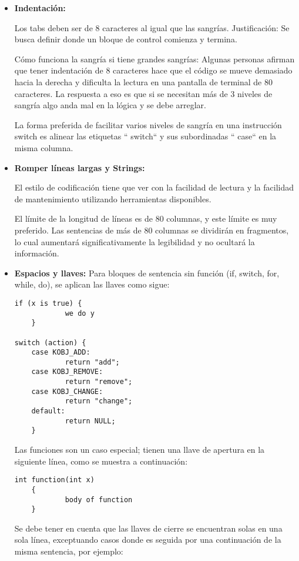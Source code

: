 \begin{itemize}

\item\textbf{Indentación:}
{Los tabs deben ser de 8 caracteres al igual que las sangrías.
Justificación: Se busca definir donde un bloque de control comienza y termina. 

Cómo funciona la sangría si tiene grandes sangrías: Algunas personas afirman que tener indentación de 8 caracteres hace que el código se mueve demasiado hacia la derecha y dificulta la lectura en una pantalla de terminal de 80 caracteres. 
La respuesta a eso es que si se necesitan más de 3 niveles de sangría algo anda mal en la lógica y se debe arreglar.

La forma preferida de facilitar varios niveles de sangría en una instrucción switch es alinear las etiquetas `` switch`` y sus subordinadas `` case`` en la misma columna.}

\item\textbf{Romper líneas largas y Strings:}
{El estilo de codificación tiene que ver con la facilidad de lectura y la facilidad de mantenimiento utilizando herramientas disponibles.

El límite de la longitud de líneas es de 80 columnas, y este límite es muy preferido.
Las sentencias de más de 80 columnas se dividirán en fragmentos, lo cual aumentará significativamente la legibilidad y no ocultará la información.
}

\item\textbf{Espacios y llaves:}
Para bloques de sentencia sin función (if, switch, for, while, do), se aplican las llaves como sigue:

\begin{verbatim}
if (x is true) {
    	    we do y
	}

switch (action) {
	case KOBJ_ADD:
	        return "add";
	case KOBJ_REMOVE:
	        return "remove";
	case KOBJ_CHANGE:
	        return "change";
	default:
    	    return NULL;
	}
\end{verbatim}


{Las funciones son un caso especial; tienen una llave de apertura en la siguiente línea, como se muestra a continuación:}

\begin{verbatim}
int function(int x)
	{
	        body of function
	}
\end{verbatim}

{Se debe tener en cuenta que las llaves de cierre se encuentran solas en una sola línea, exceptuando casos donde es seguida por una continuación de la misma sentencia, por ejemplo:}


\end{itemize}
